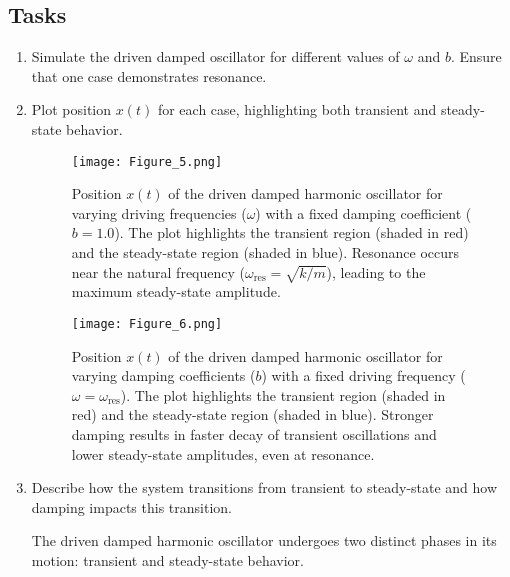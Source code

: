 \documentclass {article}
\begin{document}
\subsection*{Tasks}
\begin{enumerate}
    \item Simulate the driven damped oscillator for different values of $\omega$ and $b$. Ensure that one case demonstrates resonance.
    \item Plot position $x(t)$ for each case, highlighting both transient and steady-state behavior.
    \begin{figure}[H]
    \centering
    \texttt{[image: Figure\_5.png]} %
    \caption{Position \(x(t)\) of the driven damped harmonic oscillator for varying driving frequencies (\(\omega\)) with a fixed damping coefficient (\(b=1.0\)). The plot highlights the transient region (shaded in red) and the steady-state region (shaded in blue). Resonance occurs near the natural frequency (\(\omega_{\text{res}} = \sqrt{k/m}\)), leading to the maximum steady-state amplitude.}
    \label{fig:varying_omega}
\end{figure}

\begin{figure}[H]
    \centering
    \texttt{[image: Figure\_6.png]} %
    \caption{Position \(x(t)\) of the driven damped harmonic oscillator for varying damping coefficients (\(b\)) with a fixed driving frequency (\(\omega = \omega_{\text{res}}\)). The plot highlights the transient region (shaded in red) and the steady-state region (shaded in blue). Stronger damping results in faster decay of transient oscillations and lower steady-state amplitudes, even at resonance.}
    \label{fig:varying_b}
\end{figure}

    \item Describe how the system transitions from transient to steady-state and how damping impacts this transition.

   The driven damped harmonic oscillator undergoes two distinct phases in its motion: transient and steady-state behavior.


\end{enumerate}
\end{document}

